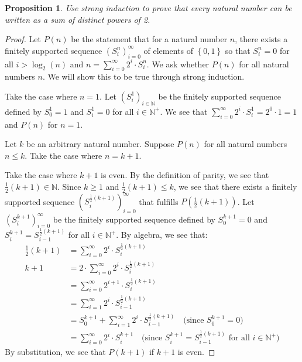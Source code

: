 \documentclass{amsart}
\newtheorem*{proposition}{Proposition}
\newcommand{\set}[1]{\left\{#1\right\}}
\newcommand{\N}{\mathbb{N}}
\numberwithin{equation}{section}
\begin{document}
	\newpage
	\begin{problem}[manual-num=74]
		\begin{proposition}
			Use strong induction to prove that every natural number can be written as a sum of distinct powers of 2.
		\end{proposition}

		\begin{proof}
			Let $P(n)$ be the statement that for a natural number $n$, there exists a finitely supported sequence $(S^n_i)_{i = 0}^\infty$ of elements of $\set{0, 1}$ so that $S^n_i = 0$ for all $i > \log_2(n)$ and $n = \sum_{i = 0}^\infty 2^i \cdot S^n_i$.
			We ask whether $P(n)$ for all natural numbers $n$.
			We will show this to be true through strong induction.

			Take the case where $n = 1$.
			Let $(S^1_i)_{i \in \N}$ be the finitely supported sequence defined by $S^1_0 = 1$ and $S^1_i = 0$ for all $i \in \N^+$.
			We see that $\sum_{i = 0}^\infty 2^i \cdot S^1_i = 2^0 \cdot 1 = 1$ and $P(n)$ for $n = 1$.

			Let $k$ be an arbitrary natural number.
			Suppose $P(n)$ for all natural numbers $n \leq k$.
			Take the case where $n = k + 1$.

			Take the case where $k + 1$ is even.
			By the definition of parity, we see that $\frac{1}{2}(k + 1) \in \N$.
			Since $k \geq 1$ and $\frac{1}{2}(k + 1) \leq k$, we see that there exists a finitely supported sequence $(S^{\frac{1}{2}(k + 1)}_i)_{i = 0}^\infty$ that fulfills $P(\frac{1}{2}(k + 1))$.
			Let $(S^{k + 1}_i)_{i = 0}^\infty$ be the finitely supported sequence defined by $S^{k + 1}_0 = 0$ and $S^{k + 1}_i = S^{\frac{1}{2}(k + 1)}_{i - 1}$ for all $i \in \N^+$.
			By algebra, we see that:
			\begin{align*}
				\frac{1}{2}(k + 1) &= \sum_{i = 0}^\infty 2^i \cdot S^{\frac{1}{2}(k + 1)}_i \\
				k + 1 &= 2 \cdot \sum_{i = 0}^\infty 2^i \cdot S^{\frac{1}{2}(k + 1)}_i \\
				&= \sum_{i = 0}^\infty 2^{i + 1} \cdot S^{\frac{1}{2}(k + 1)}_i \\
				&= \sum_{i = 1}^\infty 2^i \cdot S^{\frac{1}{2}(k + 1)}_{i - 1}\\
				&= S^{k + 1}_0 + \sum_{i = 1}^\infty 2^i \cdot S^{\frac{1}{2}(k + 1)}_{i - 1} \quad \text{(since $S^{k + 1}_0 = 0$)} \\
				&= \sum_{i = 0}^\infty 2^i \cdot S^{k + 1}_i \quad \text{(since $S^{k + 1}_i = S^{\frac{1}{2}(k + 1)}_{i - 1}$ for all $i \in \N^+$)}
			\end{align*}
			By substitution, we see that $P(k + 1)$ if $k + 1$ is even.


\end{proof}
\end{problem}
\end{document}
